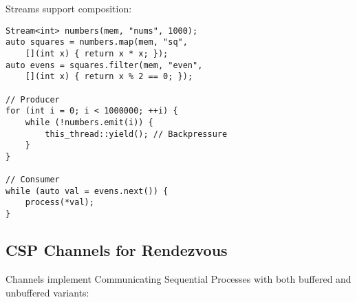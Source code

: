 \documentclass[letterpaper,twocolumn,10pt]{article}
\begin{document}
Streams support composition:

\begin{lstlisting}
Stream<int> numbers(mem, "nums", 1000);
auto squares = numbers.map(mem, "sq", 
    [](int x) { return x * x; });
auto evens = squares.filter(mem, "even",
    [](int x) { return x % 2 == 0; });

// Producer
for (int i = 0; i < 1000000; ++i) {
    while (!numbers.emit(i)) {
        this_thread::yield(); // Backpressure
    }
}

// Consumer
while (auto val = evens.next()) {
    process(*val);
}
\end{lstlisting}

\subsection{CSP Channels for Rendezvous}

Channels implement Communicating Sequential Processes with both buffered and unbuffered variants:
\end{document}

